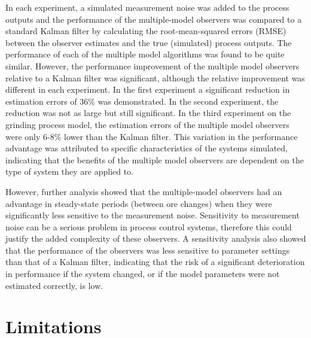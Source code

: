 In each experiment, a simulated measurement noise was added to the process outputs and the performance of the multiple-model observers was compared to a standard Kalman filter by calculating the root-mean-squared errors (\gls{RMSE}) between the observer estimates and the true (simulated) process outputs. The performance of each of the multiple model algorithms was found to be quite similar. However, the performance improvement of the multiple model observers relative to a Kalman filter was significant, although the relative improvement was different in each experiment. In the first experiment a significant reduction in estimation errors of 36\% was demonstrated. In the second experiment, the reduction was not as large but still significant. In the third experiment on the grinding process model, the estimation errors of the multiple model observers were only 6-8\% lower than the Kalman filter. This variation in the performance advantage was attributed to specific characteristics of the systems simulated, indicating that the benefits of the multiple model observers are dependent on the type of system they are applied to.

However, further analysis showed that the multiple-model observers had an advantage in steady-state periods (between ore changes) when they were significantly less sensitive to the measurement noise. Sensitivity to measurement noise can be a serious problem in process control systems, therefore this could justify the added complexity of these observers. A sensitivity analysis also showed that the performance of the observers was less sensitive to parameter settings than that of a Kalman filter, indicating that the risk of a significant deterioration in performance if the system changed, or if the model parameters were not estimated correctly, is low.

\section*{Limitations}

